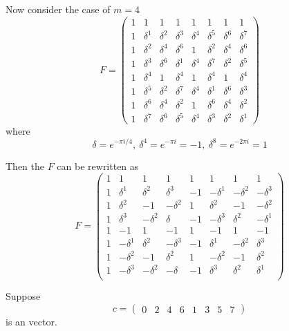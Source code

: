 Now consider the case of $m = 4$ \[
    F = \begin{pmatrix}
        1 & 1 & 1 & 1 & 1 & 1 & 1 & 1 \\
        1 & \delta^1 & \delta^2 & \delta^3 & \delta^4 & \delta^5 & \delta^6 & \delta^7 \\
        1 & \delta^2 & \delta^4 & \delta^6 & 1 & \delta^2 & \delta^4 & \delta^6 \\
        1 & \delta^3 & \delta^6 & \delta^1 & \delta^4 & \delta^7 & \delta^2 & \delta^5 \\
        1 & \delta^4 & 1 & \delta^4 & 1 & \delta^4 & 1 & \delta^4 \\
        1 & \delta^5 & \delta^2 & \delta^7 & \delta^4 & \delta^1 & \delta^6 & \delta^3 \\
        1 & \delta^6 & \delta^4 & \delta^2 & 1 & \delta^6 & \delta^4 & \delta^2 \\
        1 & \delta^7 & \delta^6 & \delta^5 & \delta^4 & \delta^3 & \delta^2 & \delta^1
    \end{pmatrix}
\]
where \[
    \delta = e^{-\pi i / 4}, \ \delta^4 = e^{-\pi i} = -1,\ \delta^8 = e^{-2\pi i} = 1
\]

Then the $F$ can be rewritten as \begin{equation}
    F = \begin{pmatrix}
        1 & 1 & 1 & 1 & 1 & 1 & 1 & 1 \\
        1 & \delta^1 & \delta^2 & \delta^3 & -1 & -\delta^1 & -\delta^2 & -\delta^3 \\
        1 & \delta^2 & -1 & -\delta^2 & 1 & \delta^2 & -1 & -\delta^2 \\
        1 & \delta^3 & -\delta^2 & \delta & -1 & -\delta^3 & \delta^2 & -\delta^1 \\
        1 & -1 & 1 & -1 & 1 & -1 & 1 & -1 \\
        1 & -\delta^1 & \delta^2 & -\delta^3 & -1 & \delta^1 & -\delta^2 & \delta^3 \\
        1 & -\delta^2 & -1 & \delta^2 & 1 & -\delta^2 & -1 & \delta^2 \\
        1 & -\delta^3 & -\delta^2 & -\delta & -1 & \delta^3 & \delta^2 & \delta^1 \\  
    \end{pmatrix} \label{eq:F4}
\end{equation}

Suppose \[
    c = \begin{pmatrix}
        0 & 2 & 4 & 6 & 1 & 3 & 5 & 7
    \end{pmatrix}
\]
is an  vector.

